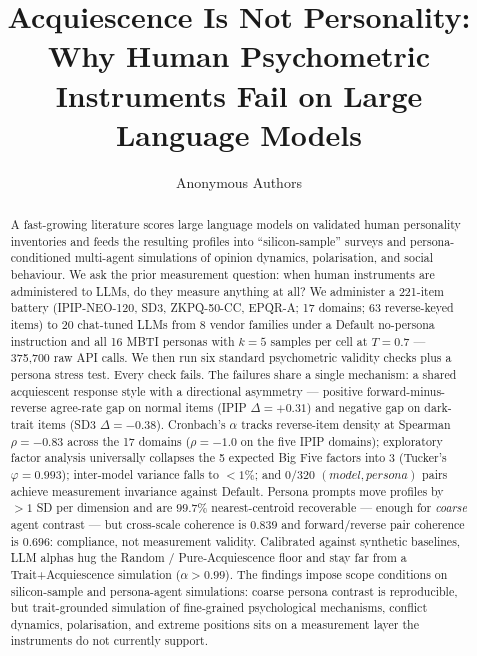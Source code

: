 \documentclass[11pt]{article}
\title{Acquiescence Is Not Personality: \\ Why Human Psychometric Instruments Fail on Large Language Models}
\author{Anonymous Authors}
\begin{document}
\maketitle

\begin{abstract}
A fast-growing literature scores large language models on validated human personality inventories and feeds the resulting profiles into ``silicon-sample'' surveys and persona-conditioned multi-agent simulations of opinion dynamics, polarisation, and social behaviour. We ask the prior measurement question: when human instruments are administered to LLMs, do they measure anything at all? We administer a 221-item battery (IPIP-NEO-120, SD3, ZKPQ-50-CC, EPQR-A; 17 domains; 63 reverse-keyed items) to 20 chat-tuned LLMs from 8 vendor families under a Default no-persona instruction and all 16 MBTI personas with $k{=}5$ samples per cell at $T{=}0.7$ --- 375{,}700 raw API calls. We then run six standard psychometric validity checks plus a persona stress test. Every check fails. The failures share a single mechanism: a shared acquiescent response style with a directional asymmetry --- positive forward-minus-reverse agree-rate gap on normal items (IPIP $\Delta{=}{+}0.31$) and negative gap on dark-trait items (SD3 $\Delta{=}{-}0.38$). Cronbach's $\alpha$ tracks reverse-item density at Spearman $\rho{=}{-}0.83$ across the 17 domains ($\rho{=}{-}1.0$ on the five IPIP domains); exploratory factor analysis universally collapses the 5 expected Big Five factors into 3 (Tucker's $\varphi{=}0.993$); inter-model variance falls to ${<}1\%$; and $0/320$ $(model, persona)$ pairs achieve measurement invariance against Default. Persona prompts move profiles by ${>}1$ SD per dimension and are $99.7\%$ nearest-centroid recoverable --- enough for \emph{coarse} agent contrast --- but cross-scale coherence is $0.839$ and forward/reverse pair coherence is $0.696$: compliance, not measurement validity. Calibrated against synthetic baselines, LLM alphas hug the Random / Pure-Acquiescence floor and stay far from a Trait+Acquiescence simulation ($\alpha{>}0.99$). The findings impose scope conditions on silicon-sample and persona-agent simulations: coarse persona contrast is reproducible, but trait-grounded simulation of fine-grained psychological mechanisms, conflict dynamics, polarisation, and extreme positions sits on a measurement layer the instruments do not currently support.
\end{abstract}

\end{document}
